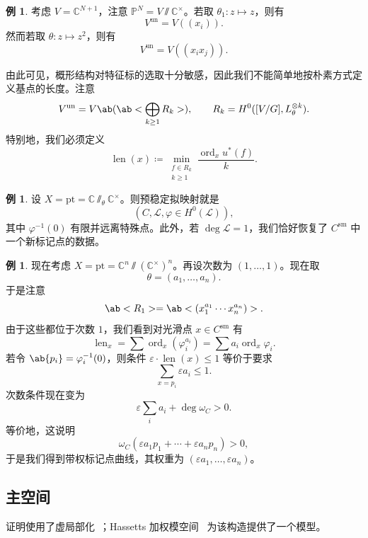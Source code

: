 \documentclass{amsart}
\theoremstyle{definition}
\newtheorem{exm}[thm]{例}
\theoremstyle{remark}
\theoremstyle{plain}
\theoremstyle{definition}
\theoremstyle{remark}
\newcommand{\C}{\mathbb{C}}
\renewcommand{\P}{\mathbb{P}}
\newcommand{\ep}{\varepsilon}
\newcommand{\mc}[1]{\mathcal{#1}}
\newcommand{\mr}[1]{\mathrm{#1}}
\newcommand{\on}[1]{\operatorname{#1}}
\newcommand{\1}{\mathbf{1}}
\newcommand{\2}{\mathbf{2}}
\newcommand{\3}{\mathbf{3}}
\begin{document}
\begin{exm}
    考虑 \(V = \C^{N+1}\)，注意 \(\P^N = V \sslash \C^{\times}\)。若取 \(\theta_1 \colon z \mapsto z\)，则有
    \[ V^{\on{un}} = V((x_i)). \]
    然而若取 \(\theta \colon z \mapsto z^2\)，则有
    \[ V^{\on{un}} = V((x_i x_j)). \]
\end{exm}

由此可见，概形结构对特征标的选取十分敏感，因此我们不能简单地按朴素方式定义基点的长度。注意
\[ V^{\on{un}} = V\ab(\ab< \bigoplus_{k \geq 1} R_k>), \qquad R_k = H^0([V/G], L_{\theta}^{\otimes k}). \]
特别地，我们必须定义
\[ \on{len}(x) \coloneqq \min_{\substack{f \in R_k \\ k \geq 1}} \frac{\on{ord}_x u^*(f)}{k}. \]

\begin{exm}
    设 \(X = \mr{pt} = \C \sslash_{\theta} \C^{\times}\)。则预稳定拟映射就是
    \[ (C, \mc{L}, \varphi \in H^0(\mc{L})), \]
    其中 \(\varphi^{-1}(0)\) 有限并远离特殊点。此外，若 \(\deg \mc{L} = 1\)，我们恰好恢复了 \(C^{\mr{sm}}\) 中一个新标记点的数据。
\end{exm}

\begin{exm}
    现在考虑 \(X = \mr{pt} = \C^n \sslash (\C^{\times})^n\)。再设次数为 \((1, \ldots, 1)\)。现在取
    \[ \theta = (a_1, \ldots, a_n). \]
    于是注意
    \[ \ab<R_1> = \ab<(x_1^{a_1} \cdots x_n^{a_n})>. \]
    由于这些都位于次数 \(1\)，我们看到对光滑点 \(x \in C^{\mr{sm}}\) 有
    \[ \on{len}_x = \sum \on{ord}_x (\varphi_i^{a_i}) = \sum a_i \on{ord}_x \varphi_i. \]
    若令 \(\ab\{p_i\} = \varphi_i^{-1}(0)\)，则条件 \(\ep \cdot \on{len}(x) \leq 1\) 等价于要求
    \[ \sum_{x = p_i} \ep a_i \leq 1. \]
    次数条件现在变为
    \[ \ep \sum_i a_i + \deg \omega_C > 0. \]
    等价地，这说明
    \[ \omega_C(\ep a_1 p_1 + \cdots + \ep a_n p_n) > 0, \]
    于是我们得到带权标记点曲线，其权重为 \((\ep a_1, \ldots, \ep a_n)\)。
\end{exm}

\subsection{主空间}%
\label{sub:Master space}

证明使用了虚局部化~\cite{GP1999}；Hassett\textquotesingle s 加权模空间~\cite{Hassett2003} 为该构造提供了一个模型。
\end{document}
